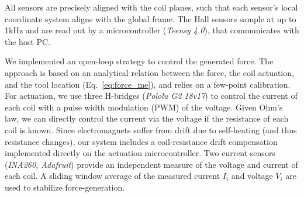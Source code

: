 All sensors are precisely aligned with the coil planes, such that each sensor's local coordinate system aligns with the global frame. The Hall sensors sample at up to 1kHz and are read out by a microcontroller (\emph{Teensy 4.0}), that communicates with the host PC.

We implemented an open-loop strategy to control the generated force. The approach is based on an analytical relation between the force, the coil actuation, and the tool location (Eq.~\ref{eq:force_me}), and relies on a few-point calibration. For actuation, we use three H-bridges (\emph{Pololu G2 18v17}) to control the current of each coil with a pulse width modulation (PWM) of the voltage. Given Ohm's law, we can directly control the current via the voltage if the resistance of each coil is known. Since electromagnets suffer from drift due to self-heating (and thus resistance changes), our system includes a coil-resistance drift compensation implemented directly on the actuation microcontroller. Two current sensors (\emph{INA260, Adafruit}) provide an independent measure of the voltage and current of each coil. A sliding window average of the measured current $I_i$ and voltage $V_i$ are used to stabilize force-generation.